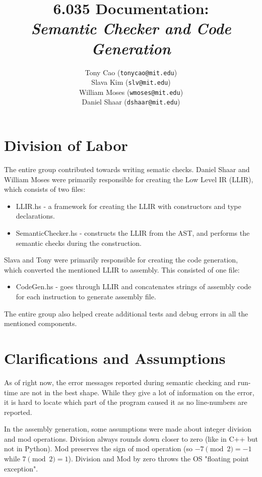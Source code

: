\documentclass[11pt]{article}
\title{6.035 Documentation: \\ \emph{Semantic Checker and Code Generation}}
\author{Tony Cao (\texttt{tonycao@mit.edu}) \\
Slava Kim (\texttt{slv@mit.edu}) \\
William Moses (\texttt{wmoses@mit.edu}) \\
Daniel Shaar (\texttt{dshaar@mit.edu})}
\date{}
\begin{document}
\maketitle

\section{Division of Labor}

\par The entire group contributed towards writing sematic checks. Daniel Shaar and William Moses were primarily responsible for creating the Low Level IR (LLIR), which consists of two files:

\begin{itemize}
    \item LLIR.hs - a framework for creating the LLIR with constructors and type declarations.
    \item SemanticChecker.hs - constructs the LLIR from the AST, and performs the semantic checks during the construction.
\end{itemize}

\par Slava and Tony were primarily responsible for creating the code generation, which converted the mentioned LLIR to assembly. This consisted of one file:

\begin{itemize}
    \item CodeGen.hs - goes through LLIR and concatenates strings of assembly code for each instruction to generate assembly file.
\end{itemize}

\par The entire group also helped create additional tests and debug errors in all the mentioned components.

\section{Clarifications and Assumptions}

\par As of right now, the error messages reported during semantic checking and run-time are not in the best shape. While they give a lot of information on the error, it is hard to locate which part of the program caused it as no line-numbers are reported.

\par In the assembly generation, some assumptions were made about integer division and mod operations. Division always rounds down closer to zero (like in C++ but not in Python). Mod preserves the sign of mod operation (so $-7 \pmod 2 = -1$ while $7 \pmod 2 = 1$). Division and Mod by zero throws the OS "floating point exception".
\end{document}
